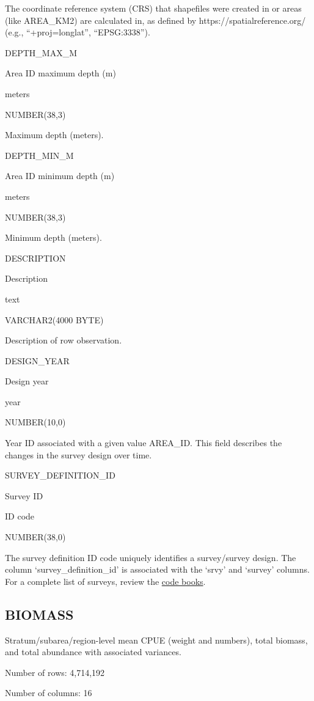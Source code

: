 \documentclass[
  letterpaper,
  oneside,
  open=any]{scrbook}
\begin{document}
The coordinate reference system (CRS) that shapefiles were created in or
areas (like AREA\_KM2) are calculated in, as defined by
https://spatialreference.org/ (e.g., ``+proj=longlat'', ``EPSG:3338'').

DEPTH\_MAX\_M

Area ID maximum depth (m)

meters

NUMBER(38,3)

Maximum depth (meters).

DEPTH\_MIN\_M

Area ID minimum depth (m)

meters

NUMBER(38,3)

Minimum depth (meters).

DESCRIPTION

Description

text

VARCHAR2(4000 BYTE)

Description of row observation.

DESIGN\_YEAR

Design year

year

NUMBER(10,0)

Year ID associated with a given value AREA\_ID. This field describes the
changes in the survey design over time.

SURVEY\_DEFINITION\_ID

Survey ID

ID code

NUMBER(38,0)

The survey definition ID code uniquely identifies a survey/survey
design. The column `survey\_definition\_id' is associated with the
`srvy' and `survey' columns. For a complete list of surveys, review the
\href{https://www.fisheries.noaa.gov/resource/document/groundfish-survey-species-code-manual-and-data-codes-manual}{code
books}.

\hypertarget{biomass}{%
\subsection{BIOMASS}\label{biomass}}

Stratum/subarea/region-level mean CPUE (weight and numbers), total
biomass, and total abundance with associated variances.

Number of rows: 4,714,192

Number of columns: 16
\end{document}
